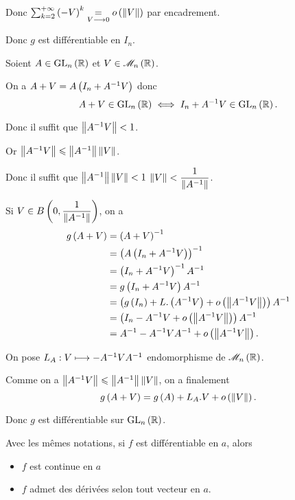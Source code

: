 \begin{corr}
Donc \(\sum_{k=2}^{\pinf}\paren{-V}^k\egqd{V\to0}\o{\norme{V}}\) par encadrement.

Donc \(g\) est différentiable en \(I_n\).

Soient \(A\in\GL{n}[\R]\) et \(V\in\M{n}[\R]\).

On a \(A+V=A\left(I_n+A^{-1} V\right)\) donc \[A+V\in\GL{n}[\R]\ssi I_n+A\inv V\in\GL{n}[\R].\]

Donc il suffit que \(\norme{A\inv V}<1\).

Or \(\norme{A\inv V}\leq\norme{A\inv}\norme{V}\).

Donc il suffit que \(\norme{A\inv}\norme{V}<1\) \ie \(\norme{V}<\dfrac{1}{\norme{A\inv}}\).

Si \(V\in\bouleo{0}{\dfrac{1}{\norme{A\inv}}}\), on a \[\begin{aligned}
g\paren{A+V}&=\paren{A+V}\inv \\
&=\paren{A\paren{I_n+A\inv V}}\inv \\
&=\paren{I_n+A\inv V}\inv A\inv \\
&=g\paren{I_n+A\inv V}A\inv \\
&=\paren{g\paren{I_n}+L.\paren{A\inv V}+\o{\norme{A\inv V}}}A\inv \\
&=\paren{I_n-A\inv V+\o{\norme{A\inv V}}}A\inv \\
&=A\inv-A\inv VA\inv+\o{\norme{A\inv V}}.
\end{aligned}\]

On pose \(L_A:V\longmapsto-A^{-1} VA^{-1}\) endomorphisme de \(\M{n}[\R]\).

Comme on a \(\norme{A\inv V}\leq\norme{A\inv}\norme{V}\), on a finalement \[g\paren{A+V}=g\paren{A}+L_A.V+\o{\norme{V}}.\]

Donc \(g\) est différentiable sur \(\GL{n}[\R]\).
\end{corr}

\begin{prop}
Avec les mêmes notations, si \(f\) est différentiable en \(a\), alors

\begin{itemize}
    \item \(f\) est continue en \(a\) \\
    \item \(f\) admet des dérivées selon tout vecteur en \(a\).
\end{itemize}
\end{prop}

